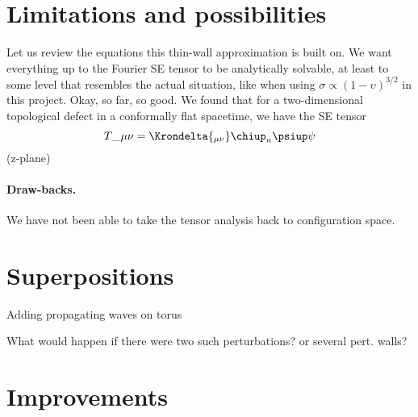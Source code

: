 \section{Limitations and possibilities}


    Let us review the equations this thin-wall approximation is built on. 
    We want everything up to the Fourier SE tensor to be analytically solvable, at least to some level that resembles the actual situation, like when using $\sigma \propto (1-\upsilon)^{3/2}$ in this project.  
    Okay, so far, so good. We found that for a two-dimensional topological defect in a conformally flat spacetime, we have the SE tensor \textchi \textit{\textpsi}
    \begin{equation}
        T\_{\mu\nu} = \Krondelta{_{\mu\nu}} \chiup_n \psiup \psi
    \end{equation}
    (z-plane) 


    \paragraph{Draw-backs.} %
    We have not been able to take the tensor analysis back to configuration space. 




\section{Superpositions}
    \begin{bullets}
        \item Adding propagating waves on torus
        \item What would happen if there were two such perturbations? or several pert. walls?
    \end{bullets}


    
\section{Improvements}



